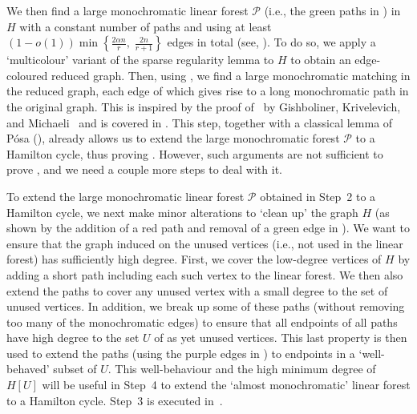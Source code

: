 \documentclass[10pt,a4paper,reqno]{amsart}
\begin{document}
\medskip
{} We then find a large monochromatic linear forest $\mathcal{P}$ (i.e., the green paths in ) in~$H$ with a constant number of paths and using at least $(1-o(1)) \min\left\{\frac{2\alpha n}{r}, \; \frac{2n}{r+1}\right\}$ edges in total (see, ). To do so, we apply a `multicolour' variant of the sparse regularity lemma to $H$ to obtain an edge-coloured reduced graph. Then, using , we find a large monochromatic matching in the reduced graph, each edge of which gives rise to a long monochromatic path in the original graph. This is inspired by the proof of~ by Gishboliner, Krivelevich, and Michaeli~\cite{Gishboliner2021colourbiased} and is covered in . This step, together with a classical lemma of P\'osa (), already allows us to extend the large monochromatic forest $\mathcal{P}$ to a Hamilton cycle, thus proving . However, such arguments are not sufficient to prove , and we need a couple more steps to deal with it.

\medskip
{} To extend the large monochromatic linear forest $\mathcal{P}$ obtained in Step~2 to a Hamilton cycle, we next make minor alterations to `clean up' the graph $H$ (as shown by the addition of a red path and removal of a green edge in ). We want to ensure that the graph induced on the unused vertices (i.e., not used in the linear forest) has sufficiently high degree. First, we cover the low-degree vertices of $H$ by adding a short path including each such vertex to the linear forest. We then also extend the paths to cover any unused vertex with a small degree to the set of unused vertices. In addition, we break up some of these paths (without removing too many of the monochromatic edges) to ensure that all endpoints of all paths have high degree to the set $U$ of as yet unused vertices. This last property is then used to extend the paths (using the purple edges in ) to endpoints in a `well-behaved' subset of $U$. This well-behaviour and the high minimum degree of $H[U]$ will be useful in Step~4 to extend the `almost monochromatic' linear forest to a Hamilton cycle. Step~3 is executed in~. 
\end{document}

